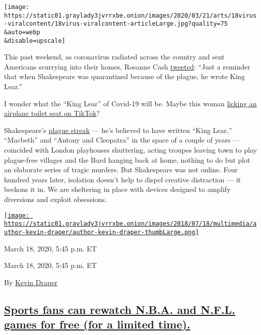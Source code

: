 \texttt{[image: https://static01.graylady3jvrrxbe.onion/images/2020/03/21/arts/18virus-viralcontent/18virus-viralcontent-articleLarge.jpg?quality=75\\\&auto=webp\\\&disable=upscale]}

This past weekend, as coronavirus radiated across the country and sent
Americans scurrying into their homes, Rosanne Cash
\href{https://twitter.com/rosannecash/status/1238700345548627969}{tweeted}:
``Just a reminder that when Shakespeare was quarantined because of the
plague, he wrote King Lear.''

I wonder what the ``King Lear'' of Covid-19 will be. Maybe this woman
\href{https://twitter.com/cbouzy/status/1239210356435812354}{licking an
airplane toilet seat on TikTok}?

Shakespeare's
\href{https://slate.com/culture/2020/03/shakespeare-plague-influence-hot-hand-ben-cohen.html}{plague
streak} --- he's believed to have written ``King Lear,'' ``Macbeth'' and
``Antony and Cleopatra'' in the space of a couple of years --- coincided
with London playhouses shuttering, acting troupes leaving town to play
plague-free villages and the Bard hanging back at home, nothing to do
but plot an elaborate series of tragic murders. But Shakespeare was not
online. Four hundred years later, isolation doesn't help to dispel
creative distraction --- it beckons it in. We are sheltering in place
with devices designed to amplify diversions and exploit obsessions.

\href{https://www.nytimes3xbfgragh.onion/by/kevin-draper}{\texttt{[image: https://static01.graylady3jvrrxbe.onion/images/2018/07/18/multimedia/author-kevin-draper/author-kevin-draper-thumbLarge.png]}}

March 18, 2020, 5:45 p.m. ET

March 18, 2020, 5:45 p.m. ET

By \href{https://www.nytimes3xbfgragh.onion/by/kevin-draper}{Kevin
Draper}

\hypertarget{sports-fans-can-rewatch-nba-and-nfl-games-for-free-for-a-limited-time}{%
\subsection{\texorpdfstring{\protect\hyperlink{sports-fans-can-rewatch-nba-and-nfl-games-for-free-for-a-limited-time}{Sports
fans can rewatch N.B.A. and N.F.L. games for free (for a limited
time).}}{Sports fans can rewatch N.B.A. and N.F.L. games for free (for a limited time).}}\label{sports-fans-can-rewatch-nba-and-nfl-games-for-free-for-a-limited-time}}

